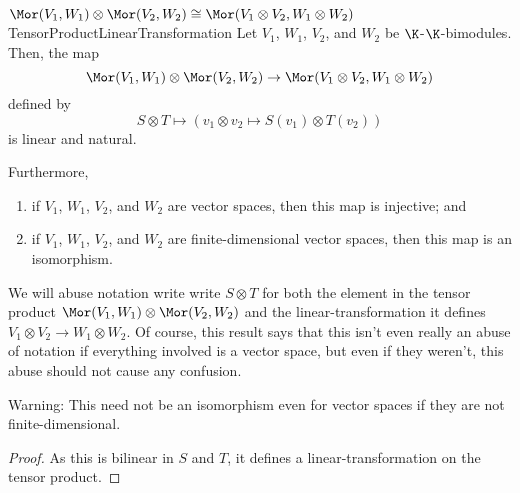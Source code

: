 \begin{thm}{$\Mor (V_1,W_1)\otimes \Mor (V_2,W_2)\cong \Mor (V_1\otimes V_2,W_1\otimes W_2)$}{TensorProductLinearTransformation}
	Let $V_1$, $W_1$, $V_2$, and $W_2$ be $\K$-$\K$-bimodules.  Then, the map
	\begin{equation*}
	\Mor (V_1,W_1)\otimes \Mor (V_2,W_2)\rightarrow \Mor (V_1\otimes V_2,W_1\otimes W_2)
	\end{equation*}
	defined by
	\begin{equation}
	S\otimes T\mapsto (v_1\otimes v_2\mapsto S(v_1)\otimes T(v_2))
	\end{equation}
	is linear and natural.
	
	Furthermore,
	\begin{enumerate}
		\item \label{TensorProductLinearTransformation(i)}if $V_1$, $W_1$, $V_2$, and $W_2$ are vector spaces, then this map is injective; and
		\item \label{TensorProductLinearTransformation(ii)}if $V_1$, $W_1$, $V_2$, and $W_2$ are finite-dimensional vector spaces, then this map is an isomorphism.
	\end{enumerate}
	\begin{rmk}
		We will abuse notation write write $S\otimes T$ for both the element in the tensor product $\Mor (V_1,W_1)\otimes \Mor (V_2,W_2)$ and the linear-transformation it defines $V_1\otimes V_2\rightarrow W_1\otimes W_2$.  Of course, this result says that this isn't even really an abuse of notation if everything involved is a vector space, but even if they weren't, this abuse should not cause any confusion.
	\end{rmk}
	\begin{rmk}
		Warning:  This need not be an isomorphism even for vector spaces if they are not finite-dimensional.
	\end{rmk}
	\begin{proof}
		As this is bilinear in $S$ and $T$, it defines a linear-transformation on the tensor product.
		

\end{proof}
\end{thm}
